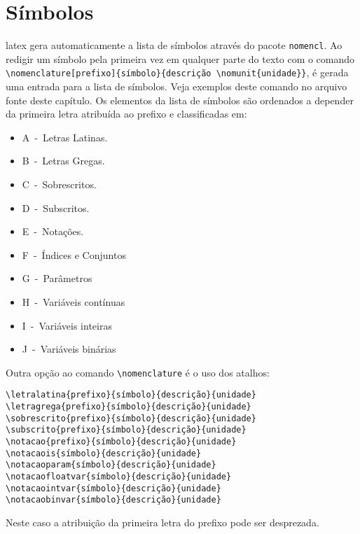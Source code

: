 \section{Símbolos}\label{sec:simbolos}

\gls{latex} gera automaticamente a lista de símbolos através do pacote \texttt{nomencl}. Ao redigir um símbolo pela primeira vez em qualquer parte do texto com o comando \verb|\nomenclature[prefixo]{símbolo}{descrição \nomunit{unidade}}|, é gerada uma entrada para a lista de símbolos. Veja exemplos deste comando no arquivo fonte deste capítulo. Os elementos da lista de símbolos são ordenados a depender da primeira letra atribuída ao prefixo e classificadas em:

\begin{itemize}%
\item A~-~Letras Latinas.
\item B~-~Letras Gregas.
\item C~-~Sobrescritos.
\item D~-~Subscritos.
\item E~-~Notações.
\item F~-~Índices e Conjuntos
\item G~-~Parâmetros
\item H~-~Variáveis contínuas
\item I~-~Variáveis inteiras
\item J~-~Variáveis binárias
\end{itemize}

Outra opção ao comando \verb|\nomenclature| é o uso dos atalhos:

\begin{SingleSpacing}%
\begin{verbatim}
\letralatina{prefixo}{símbolo}{descrição}{unidade}
\letragrega{prefixo}{símbolo}{descrição}{unidade}
\sobrescrito{prefixo}{símbolo}{descrição}{unidade}
\subscrito{prefixo}{símbolo}{descrição}{unidade}
\notacao{prefixo}{símbolo}{descrição}{unidade}
\notacaois{símbolo}{descrição}{unidade}
\notacaoparam{símbolo}{descrição}{unidade}
\notacaofloatvar{símbolo}{descrição}{unidade}
\notacaointvar{símbolo}{descrição}{unidade}
\notacaobinvar{símbolo}{descrição}{unidade}
\end{verbatim}
\end{SingleSpacing}

\noindent Neste caso a atribuição da primeira letra do prefixo pode ser desprezada.

